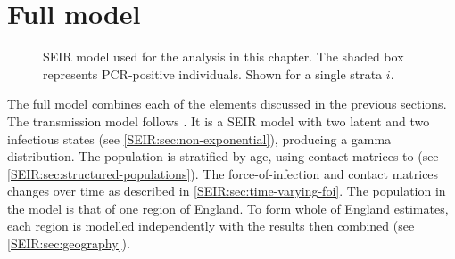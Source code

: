\documentclass[thesis.tex]{subfiles}
\begin{document}
\section{Full model} \label{SEIR:sec:full-model}

\begin{figure}
  \caption[SEIR model]{SEIR model used for the analysis in this chapter. The shaded box represents PCR-positive individuals. Shown for a single strata $i$.}
  \label{SEIR:fig:full-model}
\end{figure}

The full model combines each of the elements discussed in the previous sections.
The transmission model follows \textcite{birrellRealtime}.
It is a SEIR model with two latent and two infectious states (see \cref{SEIR:sec:non-exponential}), producing a gamma distribution.
The population is stratified by age, using contact matrices to  (see \cref{SEIR:sec:structured-populations}).
The force-of-infection and contact matrices changes over time as described in \cref{SEIR:sec:time-varying-foi}.
The population in the model is that of one region of England.
To form whole of England estimates, each region is modelled independently with the results then combined (see \cref{SEIR:sec:geography}).
\end{document}
